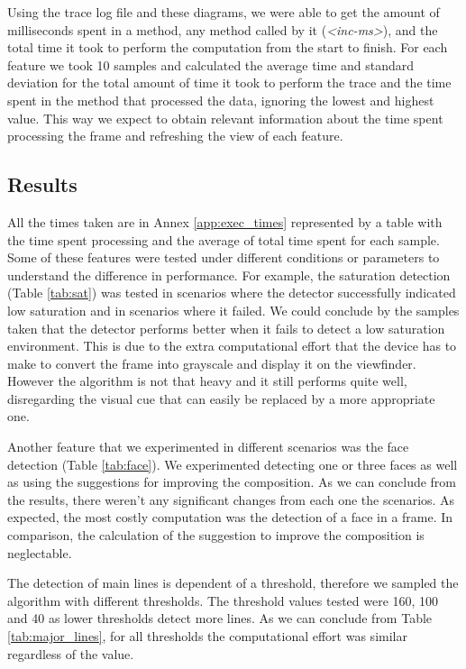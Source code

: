 Using the trace log file and these diagrams, we were able to get the amount of milliseconds spent in a method, any method called by it (\emph{<inc-ms>}), and the total time it took to perform the computation from the start to finish.
For each feature we took 10 samples and calculated the average time and standard deviation for the total amount of time it took to perform the trace and the time spent in the method that processed the data, ignoring the lowest and highest value. This way we expect to obtain relevant information about the time spent processing the frame and refreshing the view of each feature.

\subsection{Results}

All the times taken are in Annex \ref{app:exec_times} represented by a table with the time spent processing and the average of total time spent for each sample.
Some of these features were tested under different conditions or parameters to understand the difference in performance. For example, the saturation detection (Table \ref{tab:sat}) was tested in scenarios where the detector successfully indicated low saturation and in scenarios where it failed. We could conclude by the samples taken that the detector performs better when it fails to detect a low saturation environment. This is due to the extra computational effort that the device has to make to convert the frame into grayscale and display it on the viewfinder. However the algorithm is not that heavy and it still performs quite well, disregarding the visual cue that can easily be replaced by a more appropriate one.

Another feature that we experimented in different scenarios was the face detection (Table \ref{tab:face}). We experimented detecting one or three faces as well as using the suggestions for improving the composition. As we can conclude from the results, there weren't any significant changes from each one the scenarios. As expected, the most costly computation was the detection of a face in a frame. In comparison, the calculation of the suggestion to improve the composition is neglectable.

The detection of main lines is dependent of a threshold, therefore we sampled the algorithm with different thresholds. The threshold values tested were 160, 100 and 40 as lower thresholds detect more lines. As we can conclude from Table \ref{tab:major_lines}, for all thresholds the computational effort was similar regardless of the value.

